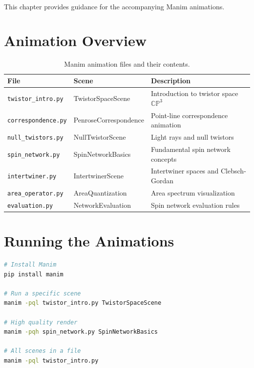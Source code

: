 \documentclass[11pt,a4paper,twoside]{book}
\theoremstyle{definition}
\newcommand{\CP}{\mathbb{CP}}
\begin{document}
This chapter provides guidance for the accompanying Manim animations.

\section{Animation Overview}

\begin{table}[htbp]
\centering
\begin{tabular}{@{}llp{6cm}@{}}
\toprule
\textbf{File} & \textbf{Scene} & \textbf{Description} \\
\midrule
\texttt{twistor\_intro.py} & TwistorSpaceScene & 
    Introduction to twistor space $\CP^3$ \\
\texttt{correspondence.py} & PenroseCorrespondence & 
    Point-line correspondence animation \\
\texttt{null\_twistors.py} & NullTwistorScene & 
    Light rays and null twistors \\
\texttt{spin\_network.py} & SpinNetworkBasics & 
    Fundamental spin network concepts \\
\texttt{intertwiner.py} & IntertwinerScene & 
    Intertwiner spaces and Clebsch-Gordan \\
\texttt{area\_operator.py} & AreaQuantization & 
    Area spectrum visualization \\
\texttt{evaluation.py} & NetworkEvaluation & 
    Spin network evaluation rules \\
\bottomrule
\end{tabular}
\caption{Manim animation files and their contents.}
\end{table}

\section{Running the Animations}

\begin{lstlisting}[language=bash, basicstyle=\ttfamily\small]
# Install Manim
pip install manim

# Run a specific scene
manim -pql twistor_intro.py TwistorSpaceScene

# High quality render
manim -pqh spin_network.py SpinNetworkBasics

# All scenes in a file
manim -pql twistor_intro.py
\end{lstlisting}

\appendix
\end{document}
